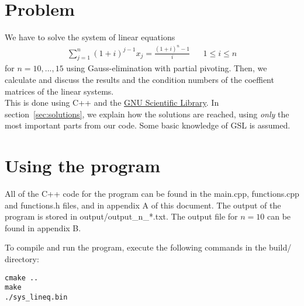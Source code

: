 \documentclass[11pt, a4paper, titlepage, openright]{article}
\begin{document}

\tableofcontents
\newpage

\section{Problem}
    We have to solve the system of linear equations
        \[
            \begin{aligned}
                \sum_{j=1}^{n} (1+i)^{j-1} x_j = \frac{(1+i)^{n} - 1}{i}     && 1 \le i \le n
            \end{aligned}
        \]
    for \( n = 10, ..., 15 \) using Gauss-elimination with partial pivoting.
    Then, we calculate and discuss the results and the condition numbers of the coeffient matrices of the linear systems. \\
    This is done using C++ and the \href{http://www.gnu.org/software/gsl/}{GNU Scientific Library}.
    In section~\ref{sec:solutions}, we explain how the solutions are reached, using \emph{only} the
    most important parts from our code. Some basic knowledge of GSL is assumed.
\bigskip
\bigskip

\section{Using the program}
    All of the C++ code for the program can be found in the main.cpp, functions.cpp and functions.h files, 
    and in appendix A of this document. The output of the program is stored in output/output\_n\_*.txt. The output file for \(n=10\) can be found in appendix B.

    To compile and run the program, execute the following commands in the build/ directory:
\begin{lstlisting}
cmake ..
make
./sys_lineq.bin
\end{lstlisting}


\newpage
\end{document}

